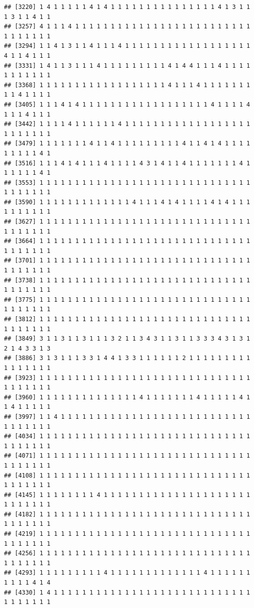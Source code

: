 \documentclass[
]{article}
\begin{document}
\begin{verbatim}
## [3220] 1 4 1 1 1 1 1 4 1 4 1 1 1 1 1 1 1 1 1 1 1 1 1 1 1 4 1 3 1 1 1 3 1 1 4 1 1
## [3257] 4 1 1 1 4 1 1 1 1 1 1 1 1 1 1 1 1 1 1 1 1 1 1 1 1 1 1 1 1 1 1 1 1 1 1 1 1
## [3294] 1 1 4 1 3 1 1 4 1 1 1 4 1 1 1 1 1 1 1 1 1 1 1 1 1 1 1 1 1 1 4 1 1 4 1 1 1
## [3331] 1 4 1 1 3 1 1 1 4 1 1 1 1 1 1 1 1 1 4 1 4 4 1 1 1 4 1 1 1 1 1 1 1 1 1 1 1
## [3368] 1 1 1 1 1 1 1 1 1 1 1 1 1 1 1 1 1 1 4 1 1 1 4 1 1 1 1 1 1 1 1 1 4 1 1 1 1
## [3405] 1 1 1 4 1 4 1 1 1 1 1 1 1 1 1 1 1 1 1 1 1 1 1 1 4 1 1 1 1 4 1 1 1 4 1 1 1
## [3442] 1 1 1 1 4 1 1 1 1 1 1 4 1 1 1 1 1 1 1 1 1 1 1 1 1 1 1 1 1 1 1 1 1 1 1 1 1
## [3479] 1 1 1 1 1 1 1 4 1 1 4 1 1 1 1 1 1 1 1 1 4 1 1 4 1 4 1 1 1 1 1 1 1 1 1 4 1
## [3516] 1 1 1 4 1 4 1 1 1 4 1 1 1 1 4 3 1 4 1 1 4 1 1 1 1 1 1 1 4 1 1 1 1 1 1 4 1
## [3553] 1 1 1 1 1 1 1 1 1 1 1 1 1 1 1 1 1 1 1 1 1 1 1 1 1 1 1 1 1 1 1 1 1 1 1 1 1
## [3590] 1 1 1 1 1 1 1 1 1 1 1 1 1 4 1 1 1 4 1 4 1 1 1 1 4 1 4 1 1 1 1 1 1 1 1 1 1
## [3627] 1 1 1 1 1 1 1 1 1 1 1 1 1 1 1 1 1 1 1 1 1 1 1 1 1 1 1 1 1 1 1 1 1 1 1 1 1
## [3664] 1 1 1 1 1 1 1 1 1 1 1 1 1 1 1 1 1 1 1 1 1 1 1 1 1 1 1 1 1 1 1 1 1 1 1 1 1
## [3701] 1 1 1 1 1 1 1 1 1 1 1 1 1 1 1 1 1 1 1 1 1 1 1 1 1 1 1 1 1 1 1 1 1 1 1 1 1
## [3738] 1 1 1 1 1 1 1 1 1 1 1 1 1 1 1 1 1 1 1 1 1 1 1 1 1 1 1 1 1 1 1 1 1 1 1 1 1
## [3775] 1 1 1 1 1 1 1 1 1 1 1 1 1 1 1 1 1 1 1 1 1 1 1 1 1 1 1 1 1 1 1 1 1 1 1 1 1
## [3812] 1 1 1 1 1 1 1 1 1 1 1 1 1 1 1 1 1 1 1 1 1 1 1 1 1 1 1 1 1 1 1 1 1 1 1 1 1
## [3849] 3 1 1 3 1 1 3 1 1 1 3 2 1 1 3 4 3 1 1 3 1 1 3 3 3 4 3 1 3 1 2 1 4 3 3 1 3
## [3886] 3 1 3 1 1 1 3 3 1 4 4 1 3 3 1 1 1 1 1 1 2 1 1 1 1 1 1 1 1 1 1 1 1 1 1 1 1
## [3923] 1 1 1 1 1 1 1 1 1 1 1 1 1 1 1 1 1 1 1 1 1 1 1 1 1 1 1 1 1 1 1 1 1 1 1 1 1
## [3960] 1 1 1 1 1 1 1 1 1 1 1 1 1 1 4 1 1 1 1 1 1 1 4 1 1 1 1 1 4 1 1 4 1 1 1 1 1
## [3997] 1 1 4 1 1 1 1 1 1 1 1 1 1 1 1 1 1 1 1 1 1 1 1 1 1 1 1 1 1 1 1 1 1 1 1 1 1
## [4034] 1 1 1 1 1 1 1 1 1 1 1 1 1 1 1 1 1 1 1 1 1 1 1 1 1 1 1 1 1 1 1 1 1 1 1 1 1
## [4071] 1 1 1 1 1 1 1 1 1 1 1 1 1 1 1 1 1 1 1 1 1 1 1 1 1 1 1 1 1 1 1 1 1 1 1 1 1
## [4108] 1 1 1 1 1 1 1 1 1 1 1 1 1 1 1 1 1 1 1 1 1 1 1 1 1 1 1 1 1 1 1 1 1 1 1 1 1
## [4145] 1 1 1 1 1 1 1 1 4 1 1 1 1 1 1 1 1 1 1 1 1 1 1 1 1 1 1 1 1 1 1 1 1 1 1 1 1
## [4182] 1 1 1 1 1 1 1 1 1 1 1 1 1 1 1 1 1 1 1 1 1 1 1 1 1 1 1 1 1 1 1 1 1 1 1 1 1
## [4219] 1 1 1 1 1 1 1 1 1 1 1 1 1 1 1 1 1 1 1 1 1 1 1 1 1 1 1 1 1 1 1 1 1 1 1 1 1
## [4256] 1 1 1 1 1 1 1 1 1 1 1 1 1 1 1 1 1 1 1 1 1 1 1 1 1 1 1 1 1 1 1 1 1 1 1 1 1
## [4293] 1 1 1 1 1 1 1 1 1 4 1 1 1 1 1 1 1 1 1 1 1 1 1 4 1 1 1 1 1 1 1 1 1 1 4 1 4
## [4330] 1 4 1 1 1 1 1 1 1 1 1 1 1 1 1 1 1 1 1 1 1 1 1 1 1 1 1 1 1 1 1 1 1 1 1 1 1

\end{verbatim}
\end{document}
